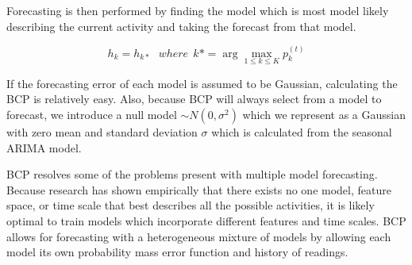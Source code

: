 Forecasting is then performed by finding the model which is most model likely describing the current activity and taking the forecast from that model.

\begin{equation}
\label{eq:prediction}
h_{k} = h_{k\ast} \ \ \ where \ \ k\ast = \arg\max_{1 \le k \le K} p_{k}^{(t)}
\end{equation}

If the forecasting error of each model is assumed to be Gaussian, calculating the BCP is relatively easy.  Also, because BCP will always select from a model to forecast, we introduce a null model $\sim N(0, \sigma^{2})$ which we represent as a Gaussian with zero mean and standard deviation $\sigma$ which is calculated from the seasonal ARIMA model.   

BCP resolves some of the problems present with multiple model forecasting.  Because research has shown \cite{Huynh2005} empirically that there exists no one model, feature space, or time scale that best describes all the possible activities, it is likely optimal to train models which incorporate different features and time scales.  BCP allows for forecasting with a heterogeneous mixture of models by allowing each model its own probability mass error function and history of readings.



